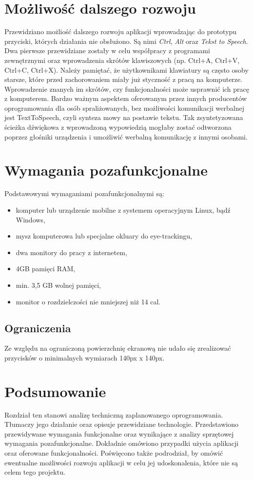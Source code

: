 \documentclass[twoside,a4paper]{book}
\begin{document}
\section{Możliwość dalszego rozwoju}
Przewidziano możliość dalszego rozwoju aplikacji wprowadzając do prototypu przyciski, których działania nie obsłużono. Są nimi \textit{Ctrl}, \textit{Alt} oraz \textit{Tekst to Speech}. Dwa pierwsze przewidziane zostały w celu współpracy z programami zewnętrznymi oraz wprowadzenia  skrótów klawiszowych (np. Ctrl+A, Ctrl+V, Ctrl+C, Ctrl+X). Należy pamiętać, że użytkownikami klawiatury są często osoby starsze, które przed zachorowaniem miały już styczność z pracą na komputerze. Wprowadzenie znanych im skrótów, czy funkcjonalności może usprawnić ich pracę z komputerem. Bardzo ważnym aspektem oferowanym przez innych producentów oprogramowania dla osób spraliżowanych, bez możliwości komunikacji werbalnej jest TextToSpeech, czyli synteza mowy na postawie tekstu. Tak zsyntetyzowana ścieżka dźwiękowa z wprowadzoną wypowiedzią mogłaby zostać odtworzona poprzez głośniki urządzenia i umożliwić werbalną komunikację z innymi osobami.
\section{Wymagania pozafunkcjonalne}
Podstawowymi wymaganiami pozafunkcjonalnymi są:
\begin{itemize}
\item komputer lub urządzenie mobilne z systemem operacyjnym Linux, bądź Windows,
\item mysz komputerowa lub specjalne okluary do eye-trackingu,
\item dwa monitory do pracy z internetem, 
\item 4GB pamięci RAM, 
\item min. 3,5 GB wolnej pamięci,
\item monitor o rozdzielczości nie mniejszej niż 14 cal.
\end{itemize} 


\subsection{Ograniczenia}
Ze względu na ograniczoną powierzchnię ekranową nie udało się zrealizować przycisków o minimalnych wymiarach 140px x 140px. 

\section{Podsumowanie}
Rozdział ten stanowi analizę techniczną zaplanowanego oprogramowania. Tłumaczy jego działanie oraz opisuje przewidziane technologie. Przedstawiono przewidywane wymagania funkcjonalne oraz wynikające z analizy sprzętowej wymagania pozafunkcjonalne. Dokładnie omówiono przypadki użycia aplikacji oraz oferowane funkcjonalności. Poświęcono także podrodział, by omówić ewentualne możliwości rozwoju aplikacji w celu jej udoskonalenia, które nie są celem tego projektu.
\end{document}
